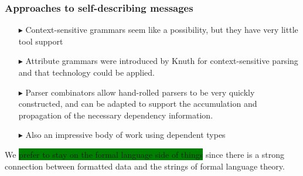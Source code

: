 \documentclass{beamer}
\newcommand{\gemph}[1]{\colorbox{green}{#1}}
\newcommand{\konst}[1]{\ensuremath{\mbox{\bf{#1}}}}
\begin{document}
\begin{frame}\frametitle{Approaches to self-describing messages}
\begin{itemize}

\item [$\blacktriangleright$] Context-sensitive grammars seem like a
  possibility, but they have very little tool support

\item [$\blacktriangleright$] Attribute grammars were introduced by
  Knuth for context-sensitive parsing and that technology could be
  applied.

\item [$\blacktriangleright$] Parser combinators allow hand-rolled
  parsers to be very quickly constructed, and can be adapted to
  support the accumulation and propagation of the necessary dependency
  information.

\item [$\blacktriangleright$] Also an impressive body of work using
  dependent types

\end{itemize}

We \gemph{prefer to stay on the formal language side of things} since there is
a strong connection between formatted data and the strings of formal
language theory.

\end{frame}








\end{document}
